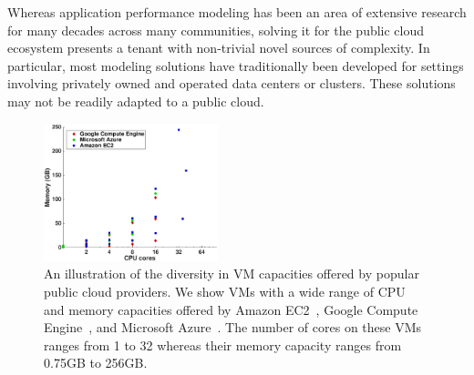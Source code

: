 
Whereas application performance modeling has been an area of extensive research for many decades across many communities, solving it for the public cloud ecosystem presents a tenant with non-trivial novel sources of complexity. In particular, most modeling solutions have traditionally been developed for settings involving privately owned and operated data centers or clusters. These solutions may not be readily adapted to a public cloud. %

\begin{figure}[htbp]
\centering
\includegraphics[width=0.45\textwidth]{cloud_vm_types.eps}
\caption{An illustration of the diversity in VM capacities offered by popular public cloud providers. We show VMs with a wide range of CPU and memory capacities offered by Amazon EC2~\cite{amazon-ec2}, Google Compute Engine~\cite{google-computeengine}, and Microsoft Azure~\cite{windows-azure}. The number of cores on these VMs ranges from 1 to 32 whereas their memory capacity ranges from 0.75GB to 256GB.} \label{fig:diversity}
\end{figure}



